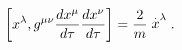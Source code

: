 \begin{equation}
\left[ x^{\lambda },g^{\mu \nu }\frac{dx^{\mu }}{d\tau }\frac{dx^{\nu }}{%
d\tau }\right] =\frac{2}{m}\stackrel{.}{x}^{\lambda }.
\end{equation}

